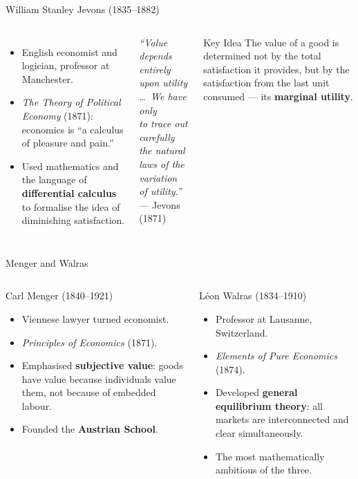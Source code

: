 \documentclass[aspectratio=169, 10pt]{beamer}
\begin{document}
\begin{frame}{William Stanley Jevons (1835--1882)}
\begin{columns}[T]
\begin{itemize}
  \item English economist and logician, professor at Manchester.
  \item \textit{The Theory of Political Economy} (1871):
        economics is ``a calculus of pleasure and pain.''
  \item Used mathematics and the language of \textbf{differential calculus}
        to formalise the idea of diminishing satisfaction.
\end{itemize}
\vspace{0.5em}
\begin{center}
\textit{``Value depends entirely upon utility \ldots\ We have only\\
to trace out carefully the natural laws of the variation\\
of utility.''}\\[4pt]
--- Jevons (1871)
\end{center}
\begin{block}{Key Idea}
The value of a good is determined not by the total satisfaction
it provides, but by the satisfaction from the \alert{last} unit
consumed --- its \textbf{marginal utility}.
\end{block}
\end{columns}
\end{frame}

\begin{frame}{Menger and Walras}
\begin{columns}[T]
\begin{block}{Carl Menger (1840--1921)}
  \begin{itemize}
    \item Viennese lawyer turned economist.
    \item \textit{Principles of Economics} (1871).
    \item Emphasised \textbf{subjective value}: goods have value because
          individuals value them, not because of embedded labour.
    \item Founded the \textbf{Austrian School}.
  \end{itemize}
\end{block}
\begin{block}{L\'{e}on Walras (1834--1910)}
  \begin{itemize}
    \item Professor at Lausanne, Switzerland.
    \item \textit{Elements of Pure Economics} (1874).
    \item Developed \textbf{general equilibrium theory}:
          all markets are interconnected and clear simultaneously.
    \item The most mathematically ambitious of the three.
  \end{itemize}
\end{block}
\end{columns}
\end{frame}
\end{document}
